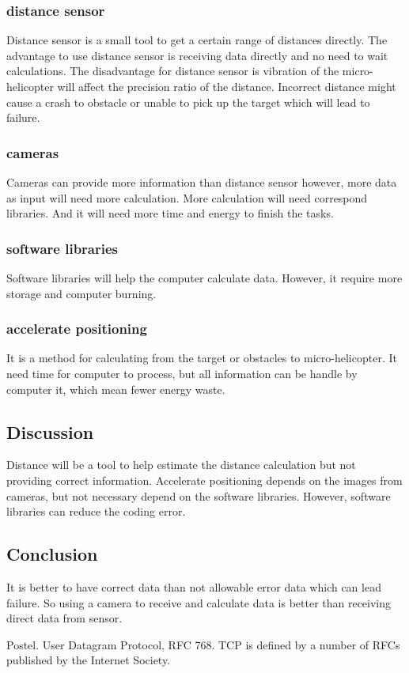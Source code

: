 \documentclass[letterpaper, 10, draftclsnofoot, onecolumn]{IEEEtran}
\begin{document}
\subsubsection*{distance sensor}
Distance sensor is a small tool to get a certain range of distances directly. The advantage to use distance sensor is receiving data directly and no need to wait calculations. The disadvantage for distance sensor is vibration of the micro-helicopter will affect the precision ratio of the distance. Incorrect distance might cause a crash to obstacle or unable to pick up the target which will lead to failure.
\subsubsection*{cameras}
Cameras can provide more information than distance sensor however, more data as input will need more calculation. More calculation will need correspond libraries. And it will need more time and energy to finish the tasks.
\subsubsection*{software libraries}
Software libraries will help the computer calculate data. However, it require more storage and computer burning.
\subsubsection*{accelerate positioning}
It is a method for calculating from the target or obstacles to micro-helicopter. It need time for computer to process, but all information can be handle by computer it, which mean fewer energy waste.
\subsection*{Discussion}
Distance will be a tool to help estimate the distance calculation but not providing correct information. Accelerate positioning depends on the images from cameras, but not necessary depend on the software libraries. However, software libraries can reduce the coding error.
\subsection*{Conclusion}
It is better to have correct data than not allowable error data which can lead failure. So using a camera to receive and calculate data is better than receiving direct data from sensor.



\begin{thebibliography}{100}
Postel. User Datagram Protocol, RFC 768.
TCP is defined by a number of RFCs published by the Internet Society.
\end{thebibliography}
\end{document}
